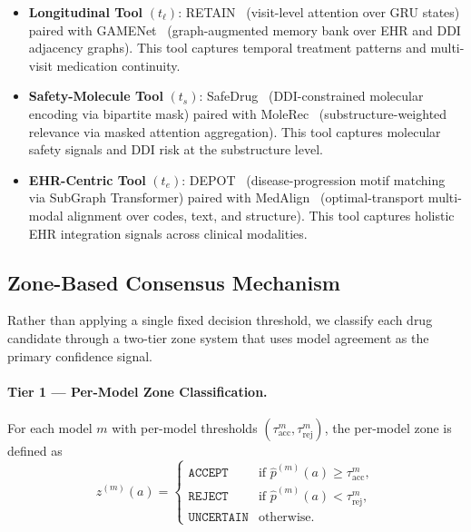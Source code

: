 \documentclass[sigconf,anonymous]{acmart}
\begin{document}
\begin{itemize}
  \item \textbf{Longitudinal Tool} $(t_\ell)$: RETAIN~\cite{retain} (visit-level attention over GRU states) paired with GAMENet~\cite{gamenet} (graph-augmented memory bank over EHR and DDI adjacency graphs). This tool captures temporal treatment patterns and multi-visit medication continuity.

  \item \textbf{Safety-Molecule Tool} $(t_s)$: SafeDrug~\cite{safedrug} (DDI-constrained molecular encoding via bipartite mask) paired with MoleRec~\cite{molerec} (substructure-weighted relevance via masked attention aggregation). This tool captures molecular safety signals and DDI risk at the substructure level.

  \item \textbf{EHR-Centric Tool} $(t_e)$: DEPOT~\cite{depot} (disease-progression motif matching via SubGraph Transformer) paired with MedAlign~\cite{medalign} (optimal-transport multi-modal alignment over codes, text, and structure). This tool captures holistic EHR integration signals across clinical modalities.
\end{itemize}

\subsection{Zone-Based Consensus Mechanism}

Rather than applying a single fixed decision threshold, we classify each drug candidate through a two-tier zone system that uses model agreement as the primary confidence signal.

\paragraph{Tier 1 — Per-Model Zone Classification.}
For each model $m$ with per-model thresholds $(\tau_{\text{acc}}^m, \tau_{\text{rej}}^m)$, the per-model zone is defined as
\begin{equation}
z^{(m)}(a) =
\begin{cases}
\texttt{ACCEPT}    & \text{if } \hat{p}^{(m)}(a) \geq \tau_{\text{acc}}^m, \\
\texttt{REJECT}    & \text{if } \hat{p}^{(m)}(a) < \tau_{\text{rej}}^m, \\
\texttt{UNCERTAIN} & \text{otherwise.}
\end{cases}
\end{equation}
\end{document}
